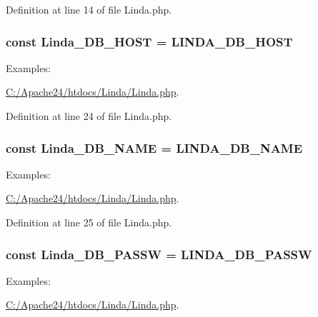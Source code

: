 Definition at line 14 of file Linda.\+php.

\hypertarget{class_linda_a4771733014ade9011a85f4d01b24f2fe}{}
\subsubsection[{Linda\+\_\+\+D\+B\+\_\+\+H\+O\+S\+T}]{\setlength{\rightskip}{0pt plus 5cm}const Linda\+\_\+\+D\+B\+\_\+\+H\+O\+S\+T = {\bf L\+I\+N\+D\+A\+\_\+\+D\+B\+\_\+\+H\+O\+S\+T}}\label{class_linda_a4771733014ade9011a85f4d01b24f2fe}
\begin{Desc}
\item[Examples\+: ]\par
\hyperlink{_c_1_2_apache24_2htdocs_2_linda_2_linda_8php-example}{C\+:/\+Apache24/htdocs/\+Linda/\+Linda.\+php}.\end{Desc}


Definition at line 24 of file Linda.\+php.

\hypertarget{class_linda_aab80e54270eaebb370e54ec5232be43a}{}
\subsubsection[{Linda\+\_\+\+D\+B\+\_\+\+N\+A\+M\+E}]{\setlength{\rightskip}{0pt plus 5cm}const Linda\+\_\+\+D\+B\+\_\+\+N\+A\+M\+E = {\bf L\+I\+N\+D\+A\+\_\+\+D\+B\+\_\+\+N\+A\+M\+E}}\label{class_linda_aab80e54270eaebb370e54ec5232be43a}
\begin{Desc}
\item[Examples\+: ]\par
\hyperlink{_c_1_2_apache24_2htdocs_2_linda_2_linda_8php-example}{C\+:/\+Apache24/htdocs/\+Linda/\+Linda.\+php}.\end{Desc}


Definition at line 25 of file Linda.\+php.

\hypertarget{class_linda_a392451b719cb6bb9b0c372832ad9e6d8}{}
\subsubsection[{Linda\+\_\+\+D\+B\+\_\+\+P\+A\+S\+S\+W}]{\setlength{\rightskip}{0pt plus 5cm}const Linda\+\_\+\+D\+B\+\_\+\+P\+A\+S\+S\+W = {\bf L\+I\+N\+D\+A\+\_\+\+D\+B\+\_\+\+P\+A\+S\+S\+W}}\label{class_linda_a392451b719cb6bb9b0c372832ad9e6d8}
\begin{Desc}
\item[Examples\+: ]\par
\hyperlink{_c_1_2_apache24_2htdocs_2_linda_2_linda_8php-example}{C\+:/\+Apache24/htdocs/\+Linda/\+Linda.\+php}.\end{Desc}


